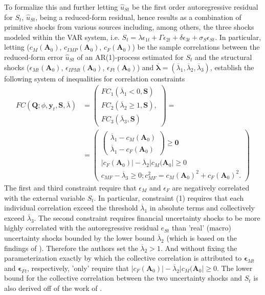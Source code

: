 \documentclass[a4paper,11pt,listof=nochaptergap,oneside,pointednumbers,bibtotoc,bigheadings,liststotoc]{scrbook}
\theoremstyle{mysatz}
\theoremstyle{mydefinition}
\theoremstyle{mytheorem}
\theoremstyle{mybemerkung}
\newcommand{\vect}[1]{\boldsymbol{\mathbf{#1}}}
\begin{document}
To formalize this and further letting $\hat{u}_{St}$ be the first order autoregressive residual for $S_t$, $\hat{u}_{St}$, being a reduced-form residual, hence results as a combination of primitive shocks from various sources including, among others, the three shocks modeled within the VAR system, i.e. $S_t = \lambda \epsilon_{1t} + \Gamma \epsilon_{2t} + \delta \epsilon_{3t} + \sigma_S \epsilon_{St}$. In particular, letting ($c_M(\vect{A}_0)$, $c_{IMP}(\vect{A}_0)$, $c_{F}(\vect{A}_0)$) be the sample correlations between the reduced-form error $\hat{u}_{St}$ of an AR(1)-process estimated for $S_t$ and the structural shocks ($\epsilon_{Mt}(\vect{A}_0)$, $\epsilon_{IPMt}(\vect{A}_0)$, $\epsilon_{Ft}(\vect{A}_0)$) and $\overline{\vect{\lambda}} = (\overline{\lambda}_1, \overline{\lambda}_2, \overline{\lambda}_3)$, \citet{ludvigsonetal:18} establish the following system of inequalities for correlation constraints
\begin{equation} \label{eq:svar_ludvi13}
\begin{split}
	FC(\vect{Q}; \phi, \vect{y}_t, \vect{S}, \overline{\lambda}) & = \begin{pmatrix}
	FC_1(\overline{\lambda}_1 < 0, \vect{S})\\
	 FC_2(\overline{\lambda}_2 \geq 1, \vect{S}), \\
	 FC_3(\overline{\lambda}_3, \vect{S})
	\end{pmatrix} = \\
	& = \begin{pmatrix}
	 		\begin{pmatrix}
	 			\overline{\lambda}_1 - c_M(\vect{A}_0)\\
				\overline{\lambda}_1 - c_F(\vect{A}_0)
			\end{pmatrix} \geq \vect{0} \\
			|c_F(\vect{A}_0)| - \overline{\lambda}_2|c_M(\vect{A}_0| \geq 0 \\
			c_{MF} - \overline{\lambda}_3 \geq 0; c_{MF}^2 = c_M(\vect{A}_0)^2 + c_F(\vect{A}_0)^2.
	\end{pmatrix} 
\end{split}								
\end{equation}
The first and third constraint require that $\epsilon_M$ and $\epsilon_F$ are negatively correlated with the external variable $S_t$. In particular, constraint (1) requires that each individual correlation exceed the threshold $\overline{\lambda}_1$ in absolute terms and collectively exceed $\overline{\lambda}_3$. The second constraint requires financial uncertainty shocks to be more highly correlated with the autoregressive residual $e_{St}$ than 'real' (macro) uncertainty shocks bounded by the lower bound $\overline{\lambda}_2$ (which is based on the findings of \citealp{btz:09}). Therefore the authors set the $\overline{\lambda}_2 > 1$. And without fixing the parameterization exactly by which the collective correlation is attributed to $\vect{\epsilon}_{Mt}$ and $\vect{\epsilon}_{Ft}$, respectively, \citet{ludvigsonetal:18} 'only' require that $|c_F(\vect{A}_0)| - \overline{\lambda}_2|c_M(\vect{A}_0| \geq 0 $. The lower bound for the collective correlation between the two uncertainty shocks and $S_t$ is also derived off of the work of \citet{btz:09}.
\end{document}

